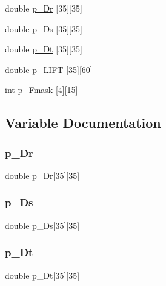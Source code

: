 \begin{DoxyCompactItemize}
\item 
double \hyperlink{a00488_a7d764eb1d8644a45d3864e0176b7a0a9}{p\+\_\+\+Dr} \mbox{[}35\mbox{]}\mbox{[}35\mbox{]}
\item 
double \hyperlink{a00488_a51e3dc3803ac7430d7d90ed367a0d2ce}{p\+\_\+\+Ds} \mbox{[}35\mbox{]}\mbox{[}35\mbox{]}
\item 
double \hyperlink{a00488_a4196078631eea2854f9f344355483f11}{p\+\_\+\+Dt} \mbox{[}35\mbox{]}\mbox{[}35\mbox{]}
\item 
double \hyperlink{a00488_abdf8cec6ca36448f72220090d9c64fc7}{p\+\_\+\+L\+I\+FT} \mbox{[}35\mbox{]}\mbox{[}60\mbox{]}
\item 
int \hyperlink{a00488_af587c3d8c1a998443c38db4f4d737779}{p\+\_\+\+Fmask} \mbox{[}4\mbox{]}\mbox{[}15\mbox{]}
\end{DoxyCompactItemize}


\subsection{Variable Documentation}
\mbox{\label{a00488_a7d764eb1d8644a45d3864e0176b7a0a9}} 
\subsubsection{\texorpdfstring{p\+\_\+\+Dr}{p\_Dr}}
{\footnotesize\ttfamily double p\+\_\+\+Dr\mbox{[}35\mbox{]}\mbox{[}35\mbox{]}}

\mbox{\label{a00488_a51e3dc3803ac7430d7d90ed367a0d2ce}} 
\subsubsection{\texorpdfstring{p\+\_\+\+Ds}{p\_Ds}}
{\footnotesize\ttfamily double p\+\_\+\+Ds\mbox{[}35\mbox{]}\mbox{[}35\mbox{]}}

\mbox{\label{a00488_a4196078631eea2854f9f344355483f11}} 
\subsubsection{\texorpdfstring{p\+\_\+\+Dt}{p\_Dt}}
{\footnotesize\ttfamily double p\+\_\+\+Dt\mbox{[}35\mbox{]}\mbox{[}35\mbox{]}}

